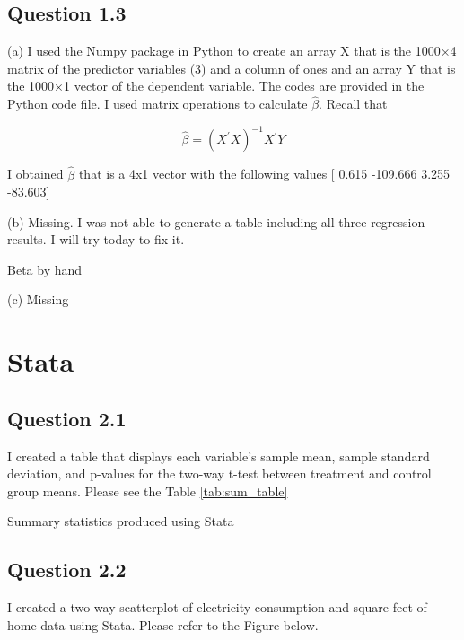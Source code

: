 \documentclass{article}
\begin{document}
\FloatBarrier
\subsection*{Question 1.3}
(a) I used the Numpy package in Python to create an array X that is the 1000×4 matrix of the predictor variables (3) and a column of ones and an array Y that is the 1000×1 vector
of the dependent variable. The codes are provided in the Python code file. I used matrix operations to calculate \(\hat{\beta}\). Recall that 

\[\hat{\beta} = (X^{'}X)^{-1}X^{'}Y \]

I obtained \(\hat{\beta}\) that is a 4x1 vector with the following values [   0.615 -109.666  3.255 -83.603]

(b) Missing.  I was not able to generate a table including all three regression results. I will try today to fix it. 

\begin{table}[hbt!]
    \centering
    
    \caption{Beta by hand}
     \label{tab:beta}
  \end{table}

  
(c) Missing

\FloatBarrier
\section*{Stata}

\subsection*{Question 2.1}

I created a table that displays each variable’s sample mean, sample standard deviation, and p-values for the two-way t-test between treatment and control group means. Please see the Table \ref{tab:sum_table}


\begin{table}[hbt!]
    \centering
    
    \caption{Summary statistics produced using Stata}
    \label{tab:sum_table}
\end{table}

\subsection*{Question 2.2}

I created a two-way scatterplot of electricity consumption and square feet of home data using Stata. Please refer to the Figure below.
\end{document}
